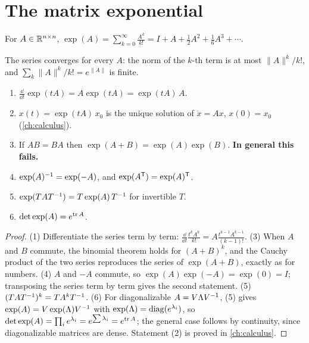 \section{The matrix exponential}
\label{sec:matexp}

\begin{definition}
For $A \in \mathbb{R}^{n\times n}$, $\exp(A) = \sum_{k=0}^\infty \frac{A^k}{k!} = I + A + \tfrac12 A^2 + \tfrac16 A^3 + \cdots$.
\end{definition}

The series converges for every $A$: the norm of the $k$-th term is at most $\|A\|^k/k!$, and $\sum_k\|A\|^k/k! = e^{\|A\|}$ is finite.

\begin{proposition}
\label{prop:matexp}
\begin{enumerate}
  \item $\frac{\dd}{\dd t}\exp(tA) = A \exp(tA) = \exp(tA)\, A$.
  \item $x(t) = \exp(tA)\, x_0$ is the unique solution of $\dot x = Ax$, $x(0) = x_0$ (\cref{ch:calculus}).
  \item If $AB = BA$ then $\exp(A + B) = \exp(A)\exp(B)$. \textbf{In general this fails.}
  \item $\exp(A)^{-1} = \exp(-A)$, and $\exp(A^{\mathsf{T}}) = \exp(A)^{\mathsf{T}}$.
  \item $\exp(T A T^{-1}) = T \exp(A)\, T^{-1}$ for invertible $T$.
  \item $\det\exp(A) = e^{\operatorname{tr} A}$.
\end{enumerate}
\end{proposition}
\begin{proof}
(1) Differentiate the series term by term: $\frac{\dd}{\dd t}\frac{t^kA^k}{k!} = A\frac{t^{k-1}A^{k-1}}{(k-1)!}$.
(3) When $A$ and $B$ commute, the binomial theorem holds for $(A + B)^k$, and the Cauchy product of the two series reproduces the series of
$\exp(A + B)$, exactly as for numbers. (4) $A$ and $-A$ commute, so $\exp(A)\exp(-A) = \exp(0) = I$; transposing the series term by term
gives the second statement. (5) $(TAT^{-1})^k = TA^kT^{-1}$. (6) For diagonalizable $A = V\Lambda V^{-1}$, (5) gives
$\exp(A) = V\exp(\Lambda)V^{-1}$ with $\exp(\Lambda) = \operatorname{diag}(e^{\lambda_i})$, so $\det\exp(A) = \prod_ie^{\lambda_i} = e^{\sum\lambda_i} = e^{\operatorname{tr} A}$;
the general case follows by continuity, since diagonalizable matrices are dense. Statement (2) is proved in \cref{ch:calculus}.
\end{proof}

